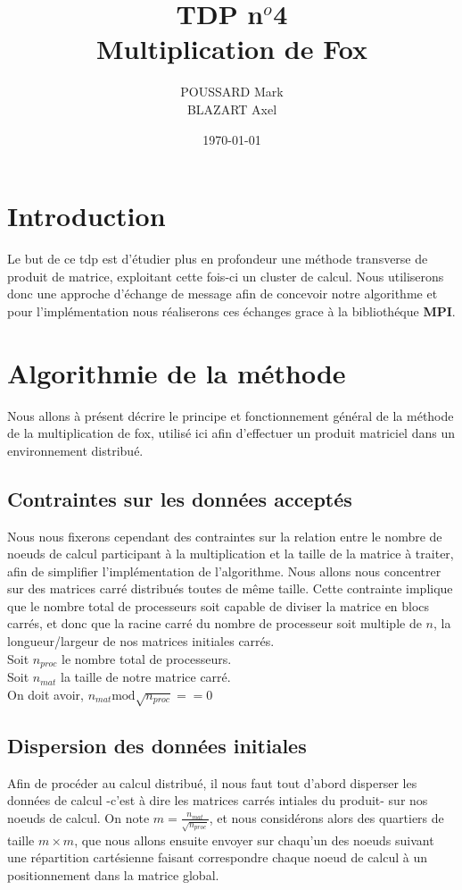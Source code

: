 \documentclass{article}
\title{TDP n$^o$4\\Multiplication de Fox}
\author{POUSSARD Mark \\ BLAZART Axel}
\date{\today}
\begin{document}
\maketitle

\section{Introduction}
Le but de ce tdp est d'étudier plus en profondeur une méthode transverse de produit de matrice, exploitant cette fois-ci un cluster de calcul. Nous utiliserons donc une approche d'échange de message afin de concevoir notre algorithme et pour l'implémentation nous réaliserons ces échanges grace à la bibliothéque \textbf{MPI}.

\section{Algorithmie de la méthode}
Nous allons à présent décrire le principe et fonctionnement général de la méthode de la multiplication de fox, utilisé ici afin d'effectuer un produit matriciel dans un environnement distribué.
\subsection{Contraintes sur les données acceptés}
Nous nous fixerons cependant des contraintes sur la relation entre le nombre de noeuds de calcul participant à la multiplication et la taille de la matrice à traiter, afin de simplifier l'implémentation de l'algorithme. Nous allons nous concentrer sur des matrices carré distribués toutes de même taille. Cette contrainte implique que le nombre total de processeurs soit capable de diviser la matrice en blocs carrés, et donc que la racine carré du nombre de processeur soit multiple de $n$, la longueur/largeur de nos matrices initiales carrés.\\
Soit $n_{proc}$ le nombre total de processeurs.\\
Soit $n_{mat}$ la taille de notre matrice carré.\\
On doit avoir, $n_{mat} \text{mod} \sqrt{n_{proc}} == 0$
\subsection{Dispersion des données initiales}
Afin de procéder au calcul distribué, il nous faut tout d'abord disperser les données de calcul -c'est à dire les matrices carrés intiales du produit- sur nos noeuds de calcul. On note $m = \frac{n_{mat}}{\sqrt{n_{proc}}}$, et nous considérons alors des quartiers de taille $m \times m$, que nous allons ensuite envoyer sur chaqu'un des noeuds suivant une répartition cartésienne faisant correspondre chaque noeud de calcul à un positionnement dans la matrice global.
\end{document}
